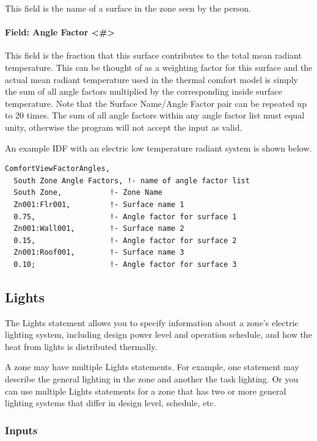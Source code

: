 This field is the name of a surface in the zone seen by the person.

\paragraph{Field: Angle Factor \textless{}\#\textgreater{}}\label{field-angle-factor}

This field is the fraction that this surface contributes to the total mean radiant temperature. This can be thought of as a weighting factor for this surface and the actual mean radiant temperature used in the thermal comfort model is simply the sum of all angle factors multiplied by the corresponding inside surface temperature. Note that the Surface Name/Angle Factor pair can be repeated up to 20 times. The sum of all angle factors within any angle factor list must equal unity, otherwise the program will not accept the input as valid.

An example IDF with an electric low temperature radiant system is shown below.

\begin{lstlisting}
ComfortViewFactorAngles,
  South Zone Angle Factors, !- name of angle factor list
  South Zone,           !- Zone Name
  Zn001:Flr001,         !- Surface name 1
  0.75,                 !- Angle factor for surface 1
  Zn001:Wall001,        !- Surface name 2
  0.15,                 !- Angle factor for surface 2
  Zn001:Roof001,        !- Surface name 3
  0.10;                 !- Angle factor for surface 3
\end{lstlisting}

\subsection{Lights}\label{lights-000}

The Lights statement allows you to specify information about a zone's electric lighting system, including design power level and operation schedule, and how the heat from lights is distributed thermally.

A zone may have multiple Lights statements. For example, one statement may describe the general lighting in the zone and another the task lighting. Or you can use multiple Lights statements for a zone that has two or more general lighting systems that differ in design level, schedule, etc.

\subsubsection{Inputs}\label{inputs-2-021}

